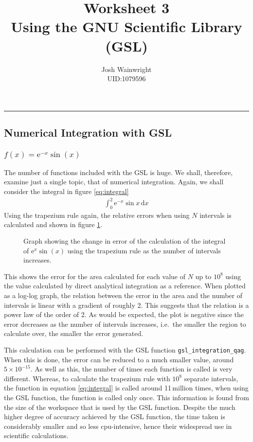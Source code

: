 \documentclass[11pt]{article} %
\author{Josh Wainwright \\ UID:1079596}
\title{Worksheet 3 \\ Using the GNU Scientific Library (GSL)}
\date{}
\newcommand{\inputTikZ}[1]{%
  }
\newcommand{\inputTikZ}[1]{%
    \beginpgfgraphicnamed{#1-external}%
    \endpgfgraphicnamed%
  }
\renewcommand{\d}{\,\mathrm{d}} %
\newcommand{\e}[1]{\text{e}^{#1}} %
\newcommand{\code}[1]{\texttt{#1}}
\begin{document}
\maketitle
\tableofcontents
\vspace{1cm}\hrule \vspace{1cm}
	\setcounter{section}{2}

	\subsection{Numerical Integration with GSL}
	\subsubsection{$f(x) = \e{-x}\sin(x)$}
	The number of functions included with the GSL is huge. We shall, therefore, examine just a single topic, that of numerical integration. Again, we shall consider the integral in figure \ref{eq:integral}
	\begin{align}
		\int_0^2 \e{-x}\sin{x}\d{x} \label{eq:integral}
	\end{align}
	Using the trapezium rule again, the relative errors when using $N$ intervals is calculated and shown in figure \ref{fig:errorstrap}. 
	\begin{figure}[h]
		\centering
			\inputTikZ{Graph1}
		\caption{\label{fig:errorstrap}Graph showing the change in error of the calculation of the integral of $\e{x}\sin(x)$ using the trapezium rule as the number of intervals increases.}
	\end{figure}
	This shows the error for the area calculated for each value of $N$ up to $10^8$ using the value calculated by direct analytical integration as a reference. When plotted as a log-log graph, the relation between the error in the area and the number of intervals is linear with a gradient of roughly 2. This suggests that the relation is a power law of the order of 2. As would be expected, the plot is negative since the error decreases as the number of intervals increases, i.e.\ the smaller the region to calculate over, the smaller the error generated.

	This calculation can be performed with the GSL function \code{gsl\_integration\_qag}. When this is done, the error can be reduced to a much smaller value, around $5\times 10^{-15}$. As well as this, the number of times each function is called is very different. Whereas, to calculate the trapezium rule with $10^8$ separate intervals, the function in equation \ref{eq:integral} is called around 11\,million times, when using the GSL function, the function is called only once. This information is found from the size of the workspace that is used by the GSL function. Despite the much higher degree of accuracy achieved by the GSL function, the time taken is considerably smaller and so less cpu-intensive, hence their widespread use in scientific calculations.
\end{document}
